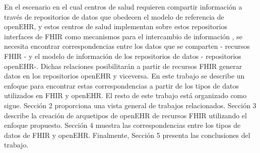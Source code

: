 En el escenario en el cual centros de salud requieren compartir información a través de repositorios de datos que obedecen el modelo de referencia de openEHR, y estos centros de salud implementan sobre estos repositorios interfaces de FHIR como mecanismos para el intercambio de información \cite{Lopez16}, se necesita encontrar correspondencias entre los datos que se comparten - recursos FHIR - y el modelo de información de los repositorios de datos - repositorios openEHR-. Dichas relaciones posibilitarán a partir de recursos FHIR generar datos en los repositorios openEHR y viceversa. En este trabajo se describe un enfoque para encontrar estas correspondencias a partir de los tipos de datos utilizados en FHIR y openEHR. El resto de este trabajo está organizado como sigue. Sección 2 proporciona una vista general de trabajos relacionados. Sección 3 describe la creación de arquetipos de openEHR de recursos FHIR utilizando el enfoque propuesto. Sección 4 muestra las correspondencias entre los tipos de datos de FHIR y openEHR. Finalmente, Sección 5 presenta las conclusiones del trabajo.
